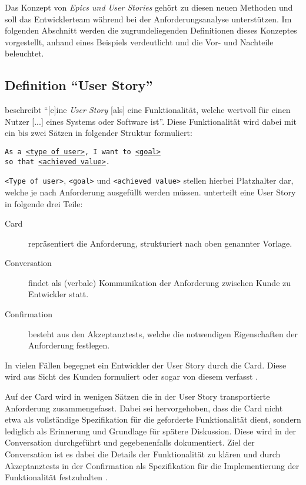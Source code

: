 \documentclass[acmtog]{acmart}
\begin{document}
Das Konzept von \emph{Epics und User Stories} gehört zu diesen neuen Methoden und soll das Entwicklerteam
während bei der Anforderungsanalyse unterstützen. Im folgenden Abschnitt werden die zugrundeliegenden Definitionen
dieses Konzeptes vorgestellt, anhand eines Beispiels verdeutlicht und die Vor- und Nachteile beleuchtet.

\subsection{Definition ``User Story''}
\cite[p. 4]{cohn_user_2004} beschreibt ``[e]ine \emph{User Story} [als] eine Funktionalität, welche wertvoll für einen Nutzer [...] eines Systems
oder Software ist''.
Diese Funktionalität wird dabei mit ein bis zwei Sätzen in folgender Struktur formuliert:

\vspace{1em}
\texttt{As a \underline{<type of user>}, I want to \underline{<goal>}\\
	\hspace*{13em} so that \underline{<achieved value>}.}
\begin{flushright}
	\cite[p. 499]{balzert09}
\end{flushright}


\vspace{.5em}

\verb|<Type of user>|, \verb|<goal>| und \verb|<achieved value>| stellen hierbei Platzhalter dar,
welche je nach Anforderung ausgefüllt werden müssen.
\cite{jeffries_essential_2001} unterteilt eine User Story in folgende drei Teile:
\begin{description}
	\item[Card] repräsentiert die Anforderung, strukturiert nach oben genannter Vorlage.
	\item[Conversation] findet als (verbale) Kommunikation der Anforderung zwischen Kunde zu Entwickler statt.
	\item[Confirmation] besteht aus den Akzeptanztests, welche die notwendigen Eigenschaften der Anforderung festlegen.
\end{description}

In vielen Fällen begegnet ein Entwickler der User Story durch die Card.
Diese wird aus Sicht des Kunden formuliert oder sogar von diesem verfasst \cite[p. 497]{balzert09}.

Auf der Card wird in wenigen Sätzen die in der User Story transportierte Anforderung zusammengefasst.
Dabei sei hervorgehoben, dass die Card nicht etwa als vollständige Spezifikation für die geforderte Funktionalität dient,
sondern lediglich als Erinnerung und Grundlage für spätere Diskussion.
Diese wird in der Conversation durchgeführt und gegebenenfalls dokumentiert.
Ziel der Conversation ist es dabei die Details der Funktionalität zu klären
und durch Akzeptanztests in der Confirmation als Spezifikation für die Implementierung
der Funktionalität festzuhalten \cite[p. 4]{cohn_user_2004}.
\end{document}
